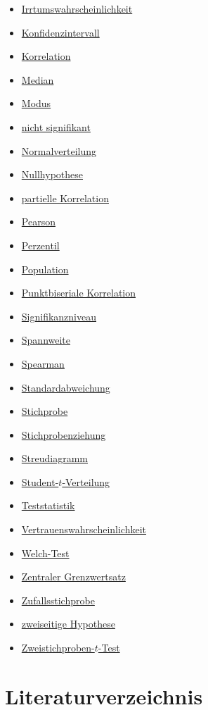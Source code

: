 \documentclass[
]{book}
\theoremstyle{definition}
\theoremstyle{definition}
\theoremstyle{definition}
\theoremstyle{definition}
\theoremstyle{remark}
\begin{document}
\begin{itemize}
\item
  \hyperref[customdef-erring-level]{Irrtumswahrscheinlichkeit}
\item
  \hyperref[customdef-confidence-interval]{Konfidenzintervall}
\item
  \hyperref[customdef-korrelation]{Korrelation}
\item
  \hyperref[customdef-median]{Median}
\item
  \hyperref[customdef-modus]{Modus}
\item
  \hyperref[customdef-signifikanz]{nicht signifikant}
\item
  \hyperref[customdef-normalverteilung]{Normalverteilung}
\item
  \hyperref[customdef-nullhypothese]{Nullhypothese}
\item
  \hyperref[customdef-partielle-korrelation]{partielle Korrelation}
\item
  \hyperref[customdef-pearson-korrelation]{Pearson}
\item
  \hyperref[customdef-perzentil]{Perzentil}
\item
  \hyperref[customdef-population]{Population}
\item
  \hyperref[customdef-punktbiseriale-korrelation]{Punktbiseriale Korrelation}
\item
  \hyperref[customdef-signifikanzniveau]{Signifikanzniveau}
\item
  \hyperref[customdef-spannweite]{Spannweite}
\item
  \hyperref[customdef-spearman-korrelation]{Spearman}
\item
  \hyperref[customdef-std]{Standardabweichung}
\item
  \hyperref[customdef-stichprobe]{Stichprobe}
\item
  \hyperref[customdef-stichprobenziehung]{Stichprobenziehung}
\item
  \hyperref[customdef-streudiagramm]{Streudiagramm}
\item
  \hyperref[customdef-student-verteilung]{Student-\(t\)-Verteilung}
\item
  \hyperref[customdef-teststatistik]{Teststatistik}
\item
  \hyperref[customdef-confidence-level]{Vertrauenswahrscheinlichkeit}
\item
  \hyperref[customdef-welch-test]{Welch-Test}
\item
  \hyperref[customdef-zentraler-grenzwertsatz]{Zentraler Grenzwertsatz}
\item
  \hyperref[customdef-zufallsstichprobe]{Zufallsstichprobe}
\item
  \hyperref[customdef-zweiseitige-hypothese]{zweiseitige Hypothese}
\item
  \hyperref[customdef-twosample-t-test]{Zweistichproben-\(t\)-Test}
\end{itemize}

\chapter*{Literaturverzeichnis}\label{literaturverzeichnis}

  
\end{document}
